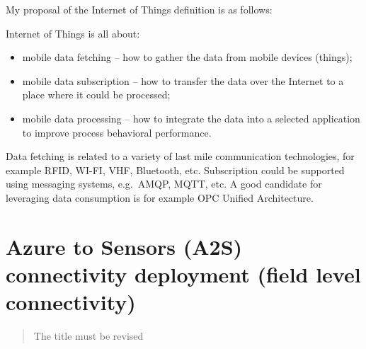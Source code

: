 \documentclass[
]{article}
\providecommand{\tightlist}{%
  \setlength{\itemsep}{0pt}\setlength{\parskip}{0pt}}
\begin{document}
My proposal of the Internet of Things definition is as follows:

Internet of Things is all about:

\begin{itemize}
\tightlist
\item
  mobile data fetching -- how to gather the data from mobile devices
  (things);
\item
  mobile data subscription -- how to transfer the data over the Internet
  to a place where it could be processed;
\item
  mobile data processing -- how to integrate the data into a selected
  application to improve process behavioral performance.
\end{itemize}

Data fetching is related to a variety of last mile communication
technologies, for example RFID, WI-FI, VHF, Bluetooth, etc. Subscription
could be supported using messaging systems, e.g.~AMQP, MQTT, etc. A good
candidate for leveraging data consumption is for example OPC Unified
Architecture.

\hypertarget{azure-to-sensors-a2s-connectivity-deployment-field-level-connectivity}{%
\section{Azure to Sensors (A2S) connectivity deployment (field level
connectivity)}\label{azure-to-sensors-a2s-connectivity-deployment-field-level-connectivity}}

\begin{quote}
The title must be revised
\end{quote}
\end{document}
